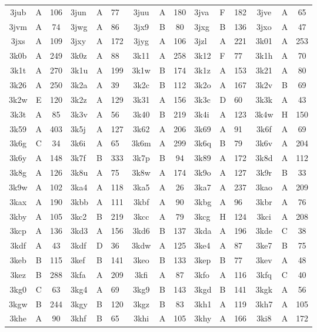 \begin{longtable}{|c|c|c| a|a|a| c|c|c| a|a|a| c|c|c|}
3jub & A & 106 & 3jun & A & 77 & 3juu & A & 180 & 3jva & F & 182 & 3jve & A & 65\\
3jvm & A & 74 & 3jwg & A & 86 & 3jx9 & B & 80 & 3jxg & B & 136 & 3jxo & A & 47\\
3jxs & A & 109 & 3jxy & A & 172 & 3jyg & A & 106 & 3jzl & A & 221 & 3k01 & A & 253\\
3k0b & A & 249 & 3k0z & A & 88 & 3k11 & A & 258 & 3k12 & F & 77 & 3k1h & A & 70\\
3k1t & A & 270 & 3k1u & A & 199 & 3k1w & B & 174 & 3k1z & A & 153 & 3k21 & A & 80\\
3k26 & A & 250 & 3k2a & A & 39 & 3k2c & B & 112 & 3k2o & A & 167 & 3k2v & B & 69\\
3k2w & E & 120 & 3k2z & A & 129 & 3k31 & A & 156 & 3k3c & D & 60 & 3k3k & A & 43\\
3k3t & A & 85 & 3k3v & A & 56 & 3k40 & B & 219 & 3k4i & A & 123 & 3k4w & H & 150\\
3k59 & A & 403 & 3k5j & A & 127 & 3k62 & A & 206 & 3k69 & A & 91 & 3k6f & A & 69\\
3k6g & C & 34 & 3k6i & A & 65 & 3k6m & A & 299 & 3k6q & B & 79 & 3k6v & A & 204\\
3k6y & A & 148 & 3k7f & B & 333 & 3k7p & B & 94 & 3k89 & A & 172 & 3k8d & A & 112\\
3k8g & A & 126 & 3k8u & A & 75 & 3k8w & A & 174 & 3k9o & A & 127 & 3k9r & B & 33\\
3k9w & A & 102 & 3ka4 & A & 118 & 3ka5 & A & 26 & 3ka7 & A & 237 & 3kao & A & 209\\
3kax & A & 190 & 3kbb & A & 111 & 3kbf & A & 90 & 3kbg & A & 96 & 3kbr & A & 76\\
3kby & A & 105 & 3kc2 & B & 219 & 3kcc & A & 79 & 3kcg & H & 124 & 3kci & A & 208\\
3kcp & A & 136 & 3kd3 & A & 156 & 3kd6 & B & 137 & 3kda & A & 196 & 3kde & C & 38\\
3kdf & A & 43 & 3kdf & D & 36 & 3kdw & A & 125 & 3ke4 & A & 87 & 3ke7 & B & 75\\
3keb & B & 115 & 3kef & B & 141 & 3keo & B & 133 & 3kep & B & 77 & 3kev & A & 48\\
3kez & B & 288 & 3kfa & A & 209 & 3kfi & A & 87 & 3kfo & A & 116 & 3kfq & C & 40\\
3kg0 & C & 63 & 3kg4 & A & 69 & 3kg9 & B & 143 & 3kgd & B & 141 & 3kgk & A & 56\\
3kgw & B & 244 & 3kgy & B & 120 & 3kgz & B & 83 & 3kh1 & A & 119 & 3kh7 & A & 105\\
3khe & A & 90 & 3khf & B & 65 & 3khi & A & 105 & 3khy & A & 166 & 3ki8 & A & 172\\

\end{longtable}
